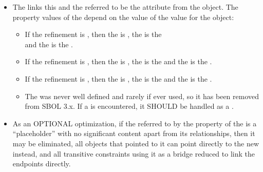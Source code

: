 \begin{itemize}
\begin{itemize}
      \item The  links this  and the  referred to be the  attribute from the  object.  The property values of the  depend on the value of the  value for the  object:
      	\begin{itemize}
	\item If the refinement is , then the  is , the  is the \\  and the  is the .
	\item If the refinement is , then the  is , the  is the  and the  is the .
	\item If the refinement is , then the  is , the  is the  and the  is the .
	\item The   was never well defined and rarely if ever used, so it has been removed from SBOL 3.x.  If a  is encountered, it SHOULD be handled as a .      
        \end{itemize}
     \item As an OPTIONAL optimization, if the  referred to by the  property of the  is a ``placeholder'' with no significant content apart from its  relationships, then it may be eliminated, all objects that pointed to it can point directly to the new  instead, and all transitive constraints using it as a bridge reduced to link the endpoints directly. 
     \end{itemize}
\end{itemize}


